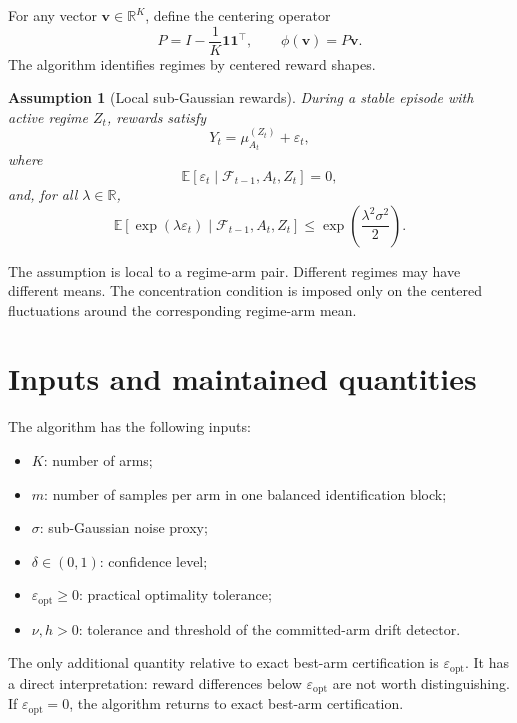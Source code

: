 \documentclass[11pt]{article}
\newtheorem{assumption}{Assumption}
\newcommand{\F}{\mathcal F}
\newcommand{\R}{\mathbb R}
\newcommand{\E}{\mathbb E}
\begin{document}
For any vector $\bm v\in\R^K$, define the centering operator
\begin{equation}
    P=I-\frac{1}{K}\bm 1\bm 1^\top,
    \qquad
    \phi(\bm v)=P\bm v.
    \label{eq:centering}
\end{equation}
The algorithm identifies regimes by centered reward shapes.

\begin{assumption}[Local sub-Gaussian rewards]
\label{ass:subgaussian}
During a stable episode with active regime $Z_t$, rewards satisfy
\begin{equation}
    Y_t=\mu_{A_t}^{(Z_t)}+\varepsilon_t,
\end{equation}
where
\begin{equation}
    \E[\varepsilon_t\mid \F_{t-1},A_t,Z_t]=0,
\end{equation}
and, for all $\lambda\in\R$,
\begin{equation}
    \E\!\left[\exp(\lambda\varepsilon_t)\mid \F_{t-1},A_t,Z_t\right]
    \leq
    \exp\!\left(\frac{\lambda^2\sigma^2}{2}\right).
    \label{eq:subgaussian}
\end{equation}
\end{assumption}

The assumption is local to a regime-arm pair. Different regimes may have different means. The concentration condition is imposed only on the centered fluctuations around the corresponding regime-arm mean.

\section{Inputs and maintained quantities}

The algorithm has the following inputs:
\begin{itemize}[leftmargin=1.5em]
    \item $K$: number of arms;
    \item $m$: number of samples per arm in one balanced identification block;
    \item $\sigma$: sub-Gaussian noise proxy;
    \item $\delta\in(0,1)$: confidence level;
    \item $\varepsilon_{\mathrm{opt}}\geq 0$: practical optimality tolerance;
    \item $\nu,h>0$: tolerance and threshold of the committed-arm drift detector.
\end{itemize}
The only additional quantity relative to exact best-arm certification is $\varepsilon_{\mathrm{opt}}$. It has a direct interpretation: reward differences below $\varepsilon_{\mathrm{opt}}$ are not worth distinguishing. If $\varepsilon_{\mathrm{opt}}=0$, the algorithm returns to exact best-arm certification.
\end{document}
